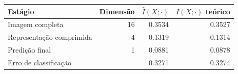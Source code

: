 \begin{tabular}{lrrr}
\toprule
Estágio & Dimensão & $\hat I(X;\cdot)$ & $I(X;\cdot)$ teórico \\
\midrule
Imagem completa & 16 & 0.3534 & 0.3527 \\
Representação comprimida & 4 & 0.1319 & 0.1314 \\
Predição final & 1 & 0.0881 & 0.0878 \\
Erro de classificação &  & 0.3271 & 0.3274 \\
\bottomrule
\end{tabular}
